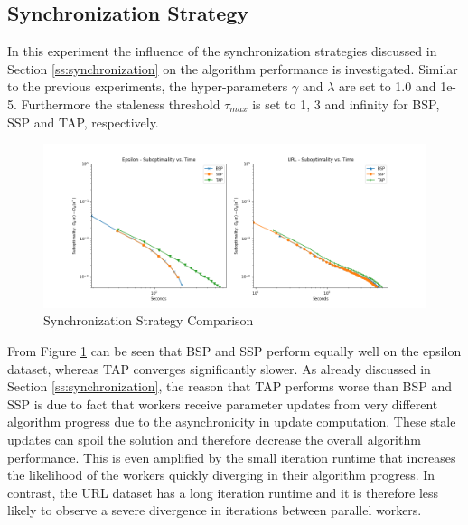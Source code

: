 \subsection{Synchronization Strategy}
In this experiment the influence of the synchronization strategies discussed in Section \ref{ss:synchronization} on the algorithm performance is investigated.
Similar to the previous experiments, the hyper-parameters $\gamma$ and $\lambda$ are set to 1.0 and 1e-5.
Furthermore the staleness threshold $\tau_{max}$ is set to 1, 3 and infinity for BSP, SSP and TAP, respectively.
\begin{figure}[ht]
\centering
\includegraphics[width=1.0\textwidth]{img/sync_strat_cmp.png}
\caption{Synchronization Strategy Comparison}
\label{fig:sync_strat_cmp}
\end{figure}
From Figure \ref{fig:sync_strat_cmp} can be seen that BSP and SSP perform equally well on the epsilon dataset, whereas TAP converges significantly slower.
As already discussed in Section \ref{ss:synchronization}, the reason that TAP performs worse than BSP and SSP is due to fact that workers receive parameter updates from very different algorithm progress due to the asynchronicity in update computation.
These stale updates can spoil the solution and therefore decrease the overall algorithm performance.
This is even amplified by the small iteration runtime that increases the likelihood of the workers quickly diverging in their algorithm progress.
In contrast, the URL dataset has a long iteration runtime and it is therefore less likely to observe a severe divergence in iterations between parallel workers.

